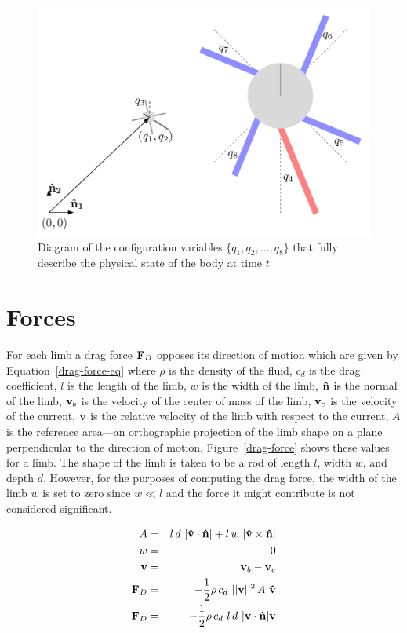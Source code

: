 \begin{figure}  
  \centering
  \includegraphics[scale=0.6]{fig/confvars.pdf} 
  \caption[Diagram of configuration variables]{\label{confvars}Diagram
    of the configuration variables $\{q_1, q_2, \ldots, q_8\}$ that
    fully describe the physical state of the body at time $t$}
\end{figure}

\section{Forces}

For each limb a drag force $\mathbf{F}_D$ opposes its direction of motion
which are given by Equation~\ref{drag-force-eq} where $\rho$ is the
density of the fluid, $c_d$ is the drag coefficient, $l$ is the length
of the limb, $w$ is the width of the limb, $\mathbf{\hat{n}}$ is the normal of
the limb, $\mathbf{v}_b$ is the velocity of the center of mass of the limb,
$\mathbf{v}_c$ is the velocity of the current, $\mathbf{v}$ is the relative
velocity of the limb with respect to the current, $A$ is the reference
area---an orthographic projection of the limb shape on a plane
perpendicular to the direction of motion.  Figure~\ref{drag-force}
shows these values for a limb.  The shape of the limb is taken to be a
rod of length $l$, width $w$, and depth $d$.  However, for the
purposes of computing the drag force, the width of the limb $w$ is set
to zero since $w \ll l$ and the force it might contribute is not
considered significant.

\begin{eqnarray}
  A &=& l\,d~ |\mathbf{\hat{v}} \cdot \mathbf{\hat{n}}| + l\, w~|\mathbf{\hat{v}} \times \mathbf{\hat{n}}|\\
  w &=& 0 \\
  \mathbf{v} &=& \mathbf{v}_b - \mathbf{v}_c \\
  \mathbf{F}_D &=& -\frac{1}{2} \rho\,c_d~||\mathbf{v}||^2\,A~\mathbf{\hat{v}} \\
  \mathbf{F}_D &=& -\frac{1}{2} \rho\, c_d~ l\,d~|\mathbf{v} \cdot \mathbf{\hat{n}}|\mathbf{v} \label{drag-force-eq} 
\end{eqnarray}



